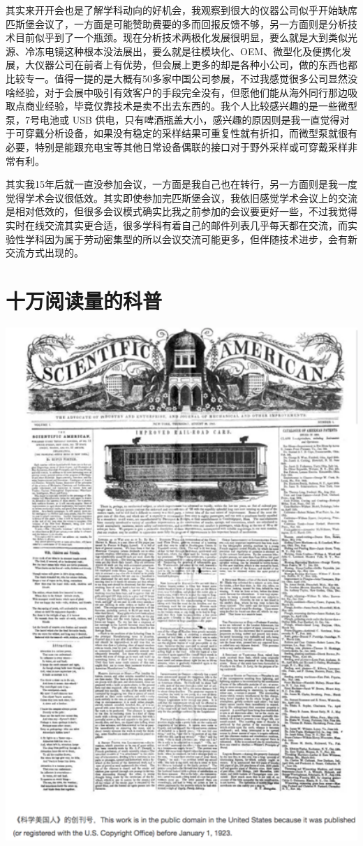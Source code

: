 \documentclass[]{book}
\begin{document}
其实来开开会也是了解学科动向的好机会，我观察到很大的仪器公司似乎开始缺席匹斯堡会议了，一方面是可能赞助费要的多而回报反馈不够，另一方面则是分析技术目前似乎到了一个瓶颈。现在分析技术两极化发展很明显，要么就是大到类似光源、冷冻电镜这种根本没法展出，要么就是往模块化、OEM、微型化及便携化发展，大仪器公司在前者上有优势，但会展上更多的却是各种小公司，做的东西也都比较专一。值得一提的是大概有50多家中国公司参展，不过我感觉很多公司显然没啥经验，对于会展中吸引有效客户的手段完全没有，但愿他们能从海外同行那边吸取点商业经验，毕竟仅靠技术是卖不出去东西的。我个人比较感兴趣的是一些微型泵，7号电池或
USB
供电，只有啤酒瓶盖大小，感兴趣的原因则是我一直觉得对于可穿戴分析设备，如果没有稳定的采样结果可重复性就有折扣，而微型泵就很有必要，特别是能跟充电宝等其他日常设备偶联的接口对于野外采样或可穿戴采样非常有利。

其实我15年后就一直没参加会议，一方面是我自己也在转行，另一方面则是我一度觉得学术会议很低效。其实即使参加完匹斯堡会议，我依旧感觉学术会议上的交流是相对低效的，但很多会议模式确实比我之前参加的会议要更好一些，不过我觉得实时在线交流其实更合适，很多学科有着自己的邮件列表几乎每天都在交流，而实验性学科因为属于劳动密集型的所以会议交流可能更多，但伴随技术进步，会有新交流方式出现的。

\section{十万阅读量的科普}

\includegraphics[width=5.72in]{images/pops1}
\end{document}
